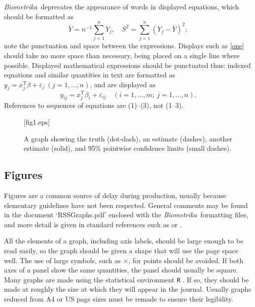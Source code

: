 \documentclass[article,lineno]{biometrika}
\def\Bka{{\it Biometrika}}
\def\T{{ \mathrm{\scriptscriptstyle T} }}
\def\v{{\varepsilon}}
\begin{document}
\Bka\ deprecates the appearance of words in displayed equations, which should be formatted as
\begin{equation}
\label{one}
\bar Y = n^{-1} \sum_{j=1}^n Y_j,\quad S^2 = \sum_{j=1}^n (Y_j-\bar Y)^2;
\end{equation}
note the punctuation and space between the expressions. Displays such as \eqref{one} should take no more space than necessary, being placed on a single line where possible.  Displayed mathematical expressions\vadjust{\pagebreak} should be punctuated thus: indexed equations and similar quantities in text are formatted as
$y_j = x_j^\T\beta + \v_j\ (j=1,\ldots, n)$, and are displayed as
\[
y_{ij} = x_j^\T\beta_i + \v_{ij}\quad (i=1,\ldots, m;\ j=1,\ldots, n).
\]
References to sequences of equations are (1)--(3), not (1--3).

\begin{figure}[t]
\vspace*{-30pt}
\figurebox{20pc}{25pc}{}[fig1.eps]
\caption{A graph showing the truth (dot-dash), an estimate (dashes), another estimate (solid), and 95\% pointwise confidence limits (small dashes).}
\label{fig1}
\end{figure}


\subsection{Figures}

Figures are a common source of delay during production, usually because elementary guidelines have not been respected.  General comments may be found in the document `RSSGraphs.pdf' enclosed with the \Bka\ formatting files, and more detail is given in standard references such as \citet{Cleveland:1993,Cleveland:1994} or \citet{Tufte:1983}.

All the elements of a graph, including axis labels, should be large enough to be read easily, so the graph should be given a shape that will use the page space well. The use of large symbols, such as $\times$, for points should be avoided. If both axes of a panel show the same quantities, the panel should usually be square.  Many graphs are made using the statistical environment \texttt{R} \citep{R:2010}.  If so, they should be made at roughly the size at which they will appear in the journal.  Usually graphs reduced from A4 or US page sizes must be remade to ensure their legibility.
\end{document}

